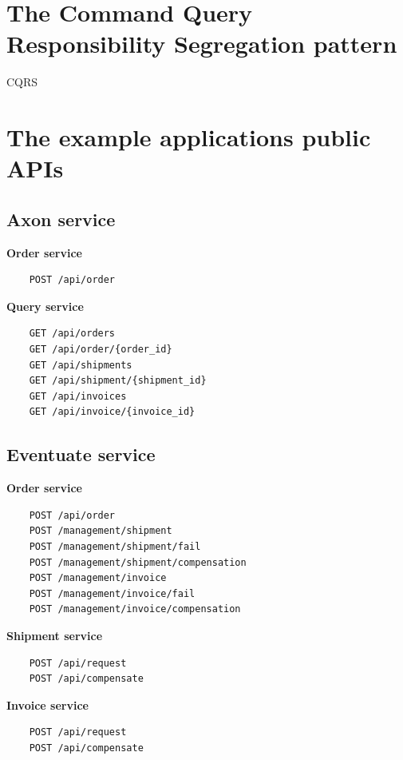 \documentclass[oneside,
  digital, %
  table,   %
  nolof,     %
  nolot,     %
]{fithesis3}
\begin{document}
\chapter{The Command Query Responsibility Segregation pattern}

CQRS

\chapter{The example applications public APIs}

\section{Axon service}

\textbf{Order service}

\begin{verbatim}
	POST /api/order
\end{verbatim}

\noindent
\textbf{Query service}

\begin{verbatim}
	GET /api/orders
	GET /api/order/{order_id}
	GET /api/shipments
	GET /api/shipment/{shipment_id}
	GET /api/invoices
	GET /api/invoice/{invoice_id}
\end{verbatim}

\section{Eventuate service}

\textbf{Order service}

\begin{verbatim}
	POST /api/order
	POST /management/shipment
	POST /management/shipment/fail
	POST /management/shipment/compensation
	POST /management/invoice
	POST /management/invoice/fail
	POST /management/invoice/compensation
\end{verbatim}

\noindent
\textbf{Shipment service}

\begin{verbatim}
	POST /api/request
	POST /api/compensate
\end{verbatim}

\noindent
\textbf{Invoice service}

\begin{verbatim}
	POST /api/request
	POST /api/compensate
\end{verbatim}
\end{document}
